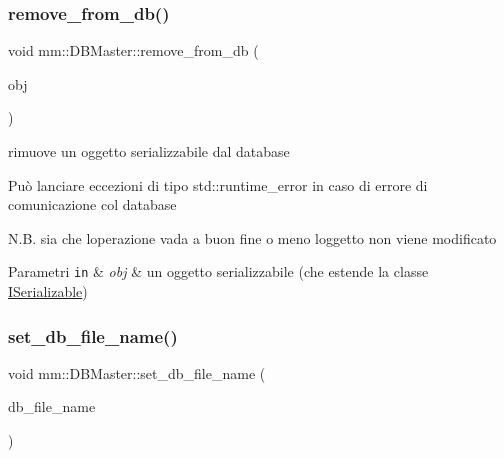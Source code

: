 \mbox{\label{classmm_1_1_d_b_master_a4d5d51bf4b3437294a52fcd3747520d3}} 
\subsubsection{\texorpdfstring{remove\+\_\+from\+\_\+db()}{remove\_from\_db()}}
{\footnotesize\ttfamily void mm\+::\+D\+B\+Master\+::remove\+\_\+from\+\_\+db (\begin{DoxyParamCaption}\item[{const \mbox{\hyperlink{classmm_1_1_i_serializable}{I\+Serializable}} \&}]{obj }\end{DoxyParamCaption})}



rimuove un oggetto serializzabile dal database 

Può lanciare eccezioni di tipo std\+::runtime\+\_\+error in caso di errore di comunicazione col database

N.\+B. sia che l\textquotesingle{}operazione vada a buon fine o meno l\textquotesingle{}oggetto non viene modificato


\begin{DoxyParams}[1]{Parametri}
\mbox{\tt in}  & {\em obj} & un oggetto serializzabile (che estende la classe \mbox{\hyperlink{classmm_1_1_i_serializable}{I\+Serializable}}) \\
\hline
\end{DoxyParams}
\mbox{\label{classmm_1_1_d_b_master_a3346d25779e18ed7ad70eed0d89347e9}} 
\subsubsection{\texorpdfstring{set\+\_\+db\+\_\+file\+\_\+name()}{set\_db\_file\_name()}}
{\footnotesize\ttfamily void mm\+::\+D\+B\+Master\+::set\+\_\+db\+\_\+file\+\_\+name (\begin{DoxyParamCaption}\item[{const string \&}]{db\+\_\+file\+\_\+name }\end{DoxyParamCaption})\hspace{0.3cm}{\ttfamily [static]}}



